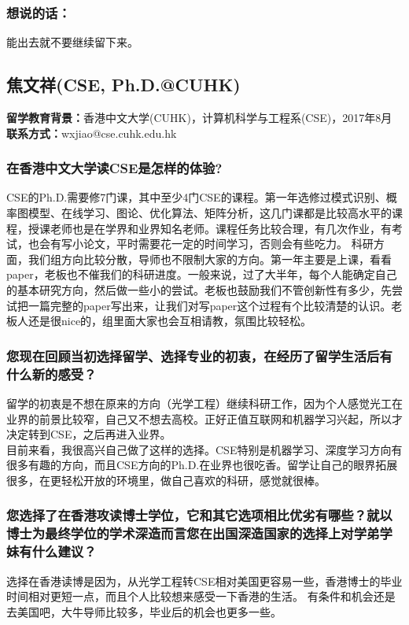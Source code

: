 \documentclass[a4paper,UTF8]{book}
\begin{document}
    \subsubsection{想说的话：}
    能出去就不要继续留下来。


\clearpage
\subsection{焦文祥(CSE, Ph.D.@CUHK)}
    \textbf{留学教育背景：}香港中文大学(CUHK)，计算机科学与工程系(CSE)，2017年8月\\
    \textbf{联系方式：}wxjiao@cse.cuhk.edu.hk

    \subsubsection*{在香港中文大学读CSE是怎样的体验?}
    CSE的Ph.D.需要修7门课，其中至少4门CSE的课程。第一年选修过模式识别、概率图模型、在线学习、图论、优化算法、矩阵分析，这几门课都是比较高水平的课程，授课老师也是在学界和业界知名老师。课程任务比较合理，有几次作业，有考试，也会有写小论文，平时需要花一定的时间学习，否则会有些吃力。
    科研方面，我们组方向比较分散，导师也不限制大家的方向。第一年主要是上课，看看paper，老板也不催我们的科研进度。一般来说，过了大半年，每个人能确定自己的基本研究方向，然后做一些小的尝试。老板也鼓励我们不管创新性有多少，先尝试把一篇完整的paper写出来，让我们对写paper这个过程有个比较清楚的认识。老板人还是很nice的，组里面大家也会互相请教，氛围比较轻松。

    
    \subsubsection*{您现在回顾当初选择留学、选择专业的初衷，在经历了留学生活后有什么新的感受？}
    留学的初衷是不想在原来的方向（光学工程）继续科研工作，因为个人感觉光工在业界的前景比较窄，自己又不想去高校。正好正值互联网和机器学习兴起，所以才决定转到CSE，之后再进入业界。\\
    目前来看，我很高兴自己做了这样的选择。CSE特别是机器学习、深度学习方向有很多有趣的方向，而且CSE方向的Ph.D.在业界也很吃香。留学让自己的眼界拓展很多，在更轻松开放的环境里，做自己喜欢的科研，感觉就很棒。

    \subsubsection*{您选择了在香港攻读博士学位，它和其它选项相比优劣有哪些？就以博士为最终学位的学术深造而言您在出国深造国家的选择上对学弟学妹有什么建议？}
    选择在香港读博是因为，从光学工程转CSE相对美国更容易一些，香港博士的毕业时间相对更短一点，而且个人比较想来感受一下香港的生活。
    有条件和机会还是去美国吧，大牛导师比较多，毕业后的机会也更多一些。
\end{document}
